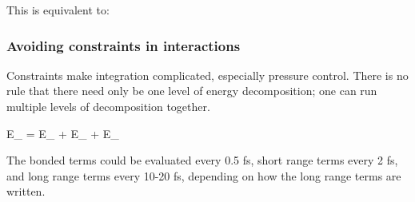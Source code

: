 \documentclass[11pt,a4paper,twoside]{article}
\begin{document}
This is equivalent to:

\subsubsection{Avoiding constraints in interactions}

Constraints make integration complicated, especially pressure control.
There is no rule that there need only be one level of energy
decomposition; one can run multiple levels of decomposition together.

\beq
E_{} = E_{} + E_{} + E_{}
\eeq

The bonded terms could be evaluated every 0.5 fs, short range terms
every 2 fs, and long range terms every 10-20 fs, depending on how the
long range terms are written.
\end{document}
